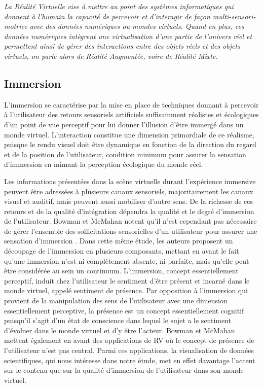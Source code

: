 \textit{La Réalité Virtuelle vise à mettre au point des systèmes informatiques qui donnent à l'humain la capacité de percevoir et d’interagir de façon multi-sensori-motrice avec des données numériques ou mondes virtuels. Quand en plus, ces données numériques intègrent une virtualisation d’une partie de l’univers réel et permettent ainsi de gérer des interactions entre des objets réels et des objets virtuels, on parle alors de Réalité Augmentée, voire de Réalité Mixte.
}

\subsection{Immersion}

L'immersion se caractérise par la mise en place de techniques donnant à percevoir à l'utilisateur des retours sensoriels artificiels suffisamment réalistes et écologiques d'un point de vue perceptif pour lui donner l'illusion d'être immergé dans un monde virtuel. L'interaction constitue une dimension primordiale de ce réalisme, puisque le rendu visuel doit être dynamique en fonction de la direction du regard et de la position de l'utilisateur, condition minimum pour assurer la sensation d'immersion en mimant la perception écologique du monde réel. 

Les informations présentées dans la scène virtuelle durant l'expérience  immersive peuvent être adressées à plusieurs canaux sensoriels, majoritairement les canaux visuel et auditif, mais peuvent aussi mobiliser d'autre sens. De la richesse de ces retours et de la qualité d'intégration dépendra la qualité et le degré d'immersion de l'utilisateur. Bowman et McMahan notent qu'il n'est cependant pas nécessaire de gérer l'ensemble des sollicitations sensorielles d'un utilisateur pour assurer une sensation d'immersion  \cite{bowman_virtual_2007}. Dans cette même étude, les auteurs proposent un découpage de l'immersion en plusieurs composants, mettant en avant le fait qu'une immersion n'est ni complètement absente, ni parfaite, mais qu'elle peut être considérée au sein un continuum. L'immersion, concept essentiellement perceptif, induit chez l'utilisateur le sentiment d'être présent et incarné dans le monde virtuel, appelé sentiment de présence. Par opposition à l'immersion qui provient de la manipulation des sens de l'utilisateur avec une dimension essentiellement perceptive, la présence est un concept essentiellement cognitif puisqu'il s'agit d'un état de conscience dans lequel le sujet a le sentiment d'évoluer dans le monde virtuel et d'y être l'acteur. Bowman et McMahan mettent également en avant des applications de RV où le concept de présence de l'utilisateur n'est pas central. Parmi ces applications, la visualisation de données scientifiques, qui nous intéresse dans notre étude, met en effet davantage l'accent sur le contenu que sur la qualité d'immersion de l'utilisateur dans son monde virtuel.

